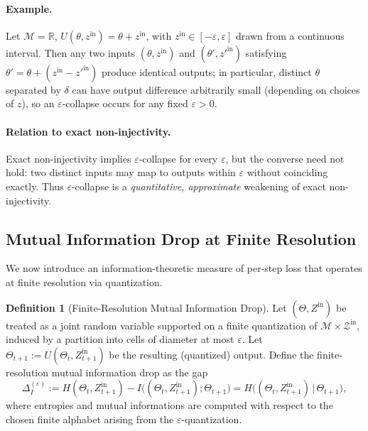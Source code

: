 \documentclass[12pt]{article}
\theoremstyle{definition}
\newtheorem{definition}{Definition}[section]
\theoremstyle{plain}
\begin{document}
\paragraph{Example.} Let \(\mathcal{M} = \mathbb{R}\), \(U(\theta,z^{\mathrm{in}}) = \theta + z^{\mathrm{in}}\), with \(z^{\mathrm{in}}\in[-\varepsilon,\varepsilon]\) drawn from a continuous interval. Then any two inputs \((\theta,z^{\mathrm{in}})\) and \((\theta',z'^{\mathrm{in}})\) satisfying \(\theta'=\theta + (z^{\mathrm{in}}-z'^{\mathrm{in}})\) produce identical outputs; in particular, distinct \(\theta\) separated by \(\delta\) can have output difference arbitrarily small (depending on choices of \(z\)), so an \(\varepsilon\)-collapse occurs for any fixed \(\varepsilon>0\).

\paragraph{Relation to exact non-injectivity.} Exact non-injectivity implies \(\varepsilon\)-collapse for every \(\varepsilon\), but the converse need not hold: two distinct inputs may map to outputs within \(\varepsilon\) without coinciding exactly.  Thus \(\varepsilon\)-collapse is a \emph{quantitative, approximate} weakening of exact non-injectivity.

\subsection{Mutual Information Drop at Finite Resolution}

We now introduce an information-theoretic measure of per-step loss that operates at finite resolution via quantization.

\begin{definition}[Finite-Resolution Mutual Information Drop]
Let \((\Theta, Z^{\mathrm{in}})\) be treated as a joint random variable supported on a finite quantization of \(\mathcal{M} \times \mathcal{Z}^{\mathrm{in}}\), induced by a partition into cells of diameter at most \(\varepsilon\).  Let \(\Theta_{t+1} := U(\Theta_t, Z^{\mathrm{in}}_{t+1})\) be the resulting (quantized) output.  Define the finite-resolution mutual information drop as the gap
\[
\Delta_I^{(\varepsilon)} := H(\Theta_t, Z^{\mathrm{in}}_{t+1}) - I\bigl((\Theta_t, Z^{\mathrm{in}}_{t+1}); \Theta_{t+1}\bigr)
= H\bigl((\Theta_t, Z^{\mathrm{in}}_{t+1}) \,\big|\, \Theta_{t+1}\bigr),
\]
where entropies and mutual informations are computed with respect to the chosen finite alphabet arising from the \(\varepsilon\)-quantization.
\end{definition}
\end{document}
